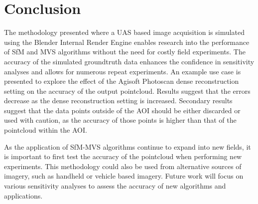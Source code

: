 \section{Conclusion}

The methodology presented where a UAS based image acquisition is simulated using the Blender Internal Render Engine enables research into the performance of SfM and MVS algorithms without the need for costly field experiments.  The accuracy of the simulated groundtruth data enhances the confidence in sensitivity analyses and allows for numerous repeat experiments.  An example use case is presented to explore the effect of the Agisoft Photoscan dense reconstruction setting on the accuracy of the output pointcloud.  Results suggest that the errors decrease as the dense reconstruction setting is increased.  Secondary results suggest that the data points outside of the AOI should be either discarded or used with caution, as the accuracy of those points is higher than that of the pointcloud within the AOI.

As the application of SfM-MVS algorithms continue to expand into new fields, it is important to first test the accuracy of the pointcloud when performing new experiments.  This methodology could also be used from alternative sources of imagery, such as handheld or vehicle based imagery.  Future work will focus on various sensitivity analyses to assess the accuracy of new algorithms and applications.  